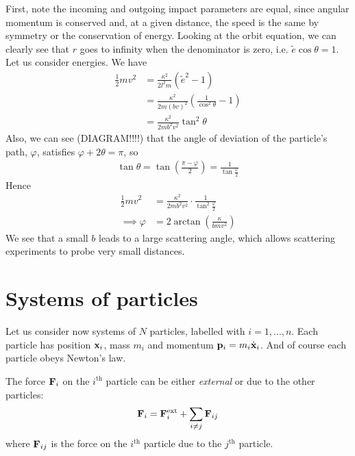 \documentclass{../template/note}
\begin{document}
    First, note the incoming and outgoing impact parameters are equal, since angular momentum is conserved and, at a given distance, the speed is the same by symmetry or the conservation of energy. Looking at the orbit equation, we can clearly see that \(r\) goes to infinity when the denominator is zero, i.e. \(\tilde e \cos \theta = 1\). Let us consider energies. We have
    \begin{align*}
        \frac 1 2 mv^2 &= \frac{\kappa^2}{2l^2m} \left(\tilde e^2 - 1\right) \\
        &= \frac{\kappa^2}{2m(bv)^2} \left(\frac{1}{\cos^2 \theta}-1\right) \\
        &= \frac{\kappa^2}{2mb^2v^2} \tan^2 \theta
    \end{align*}
    Also, we can see (DIAGRAM!!!!) that the angle of deviation of the particle's path, \(\varphi\), satisfies \(\varphi + 2\theta = \pi\), so
    \begin{align*}
        \tan \theta = \tan \left(\frac{\pi-\varphi}2\right) = \frac 1 {\tan \frac{\varphi}2}
    \end{align*}
    Hence
    \begin{align*}
        \frac 1 2 mv^2 &= \frac{\kappa^2}{2mb^2v^2} \cdot \frac 1 {\tan^2 \frac{\varphi}2} \\
        \implies \varphi &= 2 \arctan \left(\frac \kappa{bmv^2}\right)
    \end{align*}
    We see that a small \(b\) leads to a large scattering angle, which allows scattering experiments to probe very small distances.

    \section{Systems of particles}
    
    Let us consider now systems of \(N\) particles, labelled with \(i = 1, \dots, n\). Each particle has position \(\V x_i\), mass \(m_i\) and momentum \(\V p_i = m_i \dot{\V x}_i\). And of course each particle obeys Newton's law.
    
    The force \(\V F_i\) on the \(i^\text{th}\) particle can be either \emph{external} or due to the other particles:
    \begin{align*}
        \V F_i = \V F_i^\text{ext} + \sum_{i \neq j} \V F_{ij}
    \end{align*}
    where \(\V F_{ij}\) is the force on the \(i^\text{th}\) particle due to the \(j^\text{th}\) particle.
    
\end{document}
